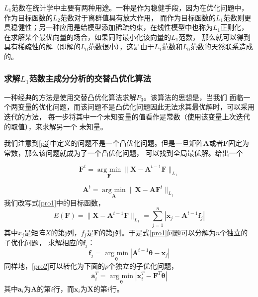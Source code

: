 $L_1$范数在统计学中主要有两种用途。一种是作为稳健手段，因为在优化问题中，作为目标函数的$L_2$范数对于离群值具有放大作用，
而作为目标函数的$L_1$范数则更具稳健性；另一种应用是给模型添加稀疏约束，在线性模型中也称为$L_1$正则化，
在求解某个最优向量的场合，如果同时最小化该向量的$L_1$范数，
那么就可以得到具有稀疏性的解（即解的$L_0$范数很小），这是由于$L_1$范数和$L_0$范数的天然联系造成的。


\subsubsection{求解$L_1$范数主成分分析的交替凸优化算法}

一种经典的方法是使用交替凸优化算法\cite{ke2005robust}求解$P_3$。该算法的思想是，当我们
面临一个两变量的优化问题，而该问题不是凸优化问题因此无法求其最优解时，可以采用迭代的方法，
每一步将其中一个未知变量的值看作是常数（使用该变量上次迭代的取值），来求解另一个
未知量。

我们注意到\eqref{p3}中定义的问题不是一个凸优化问题。但是一旦矩阵$\bm{A}$或者$\bm{F}$固定为常数，那么该问题就成为了一个凸优化问题，
可以找到全局最优解。给出一个

\begin{equation}\label{pro1}
\bm F^{t} = \underset{\bm F}{\operatorname{arg\ min}} \|\bm{X} - \bm{A}^{t-1}\bm{F} \|_{L_1} 
\end{equation}

\begin{equation}\label{pro2}
\bm{A}^{t} = \underset{\bm{A}}{\operatorname{arg\ min}} \|\bm X - \bm{A}\bm F^{t}\|_{L_1} 
\end{equation}
我们改写式\eqref{pro1}中的目标函数，
\begin{equation}\label{loss-a}
E(\bm{F}) = \|\bm{X} - \bm{A}^{t-1}\bm{F} \|_{L_1} = \sum_{j=1}^{n}|\bm{x}_j - \bm{A}^{t-1}\bm{f}_j| 
\end{equation}
其中$x_j$是矩阵$X$的第j列，$f_j$是$\bm{F}$的第j列。于是式\eqref{pro1}问题可以分解为$n$个独立的子优化问题，
求解相应的$\bm{f}_j$：
\begin{equation}\label{subpro}
    \bm{f}_j = \underset{\bm{\theta}}{\operatorname{arg\ min}} |\bm{A}^{t-1}\bm{\theta} - \bm{x}_j|
\end{equation}
同样地，\eqref{pro2}可以转化为下面的$p$个独立的子优化问题，
\begin{equation}\label{subproabs}
    \bm{a}_i^T = \underset{\bm{\theta}}{\operatorname{arg\ min}} |\bm{x}_i^T - \bm{F}^T\bm{\theta}|
\end{equation}
其中$\bm{a}_i$为$\bm{A}$的第$i$行，而$\bm{x}_i$为$\bm{X}$的第$i$行。

